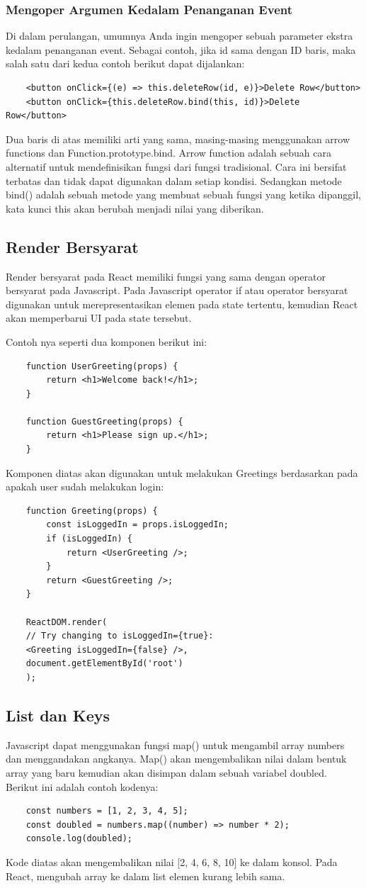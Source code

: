 \subsubsection{Mengoper Argumen Kedalam Penanganan Event}
Di dalam perulangan, umumnya Anda ingin mengoper sebuah parameter ekstra kedalam penanganan event. Sebagai contoh, jika id sama dengan ID baris, maka salah satu dari kedua contoh berikut dapat dijalankan:
\begin{lstlisting}
	<button onClick={(e) => this.deleteRow(id, e)}>Delete Row</button>
	<button onClick={this.deleteRow.bind(this, id)}>Delete Row</button>
\end{lstlisting}
Dua baris di atas memiliki arti yang sama, masing-masing menggunakan arrow functions dan Function.prototype.bind.
Arrow function adalah sebuah cara alternatif untuk mendefinisikan fungsi dari fungsi tradisional. Cara ini bersifat terbatas dan tidak dapat digunakan dalam setiap kondisi. Sedangkan metode bind() adalah sebuah metode yang membuat sebuah fungsi yang ketika dipanggil, kata kunci this akan berubah menjadi nilai yang diberikan.

\subsection{Render Bersyarat}
Render bersyarat pada React memiliki fungsi yang sama dengan operator bersyarat pada Javascript. Pada Javascript operator if atau operator bersyarat digunakan untuk merepresentasikan elemen pada state tertentu, kemudian React akan memperbarui UI pada state tersebut.

Contoh nya seperti dua komponen berikut ini:
\begin{lstlisting}
	function UserGreeting(props) {
		return <h1>Welcome back!</h1>;
	}
	
	function GuestGreeting(props) {
		return <h1>Please sign up.</h1>;
	}
\end{lstlisting}
Komponen diatas akan digunakan untuk melakukan Greetings berdasarkan pada apakah user sudah melakukan login:
\begin{lstlisting}
	function Greeting(props) {
		const isLoggedIn = props.isLoggedIn;
		if (isLoggedIn) {
			return <UserGreeting />;
		}
		return <GuestGreeting />;
	}
	
	ReactDOM.render(
	// Try changing to isLoggedIn={true}:
	<Greeting isLoggedIn={false} />,
	document.getElementById('root')
	);
\end{lstlisting} 

\subsection{List dan Keys}
Javascript dapat menggunakan fungsi map() untuk mengambil array numbers dan menggandakan angkanya. Map() akan mengembalikan nilai dalam bentuk array yang baru kemudian akan disimpan dalam sebuah variabel doubled.
Berikut ini adalah contoh kodenya:
\begin{lstlisting}
	const numbers = [1, 2, 3, 4, 5];
	const doubled = numbers.map((number) => number * 2);
	console.log(doubled);
\end{lstlisting}
Kode diatas akan mengembalikan nilai [2, 4, 6, 8, 10] ke dalam konsol. Pada React, mengubah array ke dalam list elemen kurang lebih sama.
